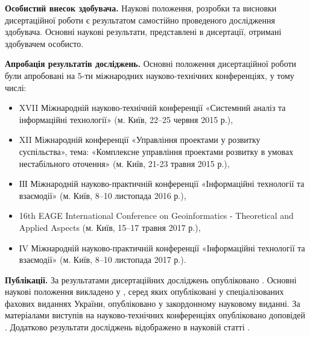 \textbf{Особистий внесок здобувача.} Наукові положення, розробки та висновки дисертаційної роботи є результатом самостійно проведеного дослідження здобувача. Основні наукові результати, представлені в дисертації, отримані здобувачем особисто.

\textbf{Апробація результатів досліджень.} Основні положення дисертаційної роботи були апробовані на 5-ти міжнародних науково-технічних конференціях, у тому числі:

\begin{itemize}
	\item XVII Міжнародній науково-технічній конференції «Системний аналіз та інформаційні технології» (м. Київ, 22--25 червня 2015 р.),
	\item XII Міжнародній конференції «Управління проектами у розвитку суспільства», тема: «Комплексне управління проектами розвитку в умовах нестабільного оточення» (м. Київ, 21-23 травня 2015 р.),
	\item ІІІ Міжнародній науково-практичній конференції «Інформаційні технології та взаємодії» (м. Київ, 8--10 листопада 2016 р.),
	\item 16th EAGE International Conference on Geoinformatics - Theoretical and Applied Aspects (м. Київ, 15--17 травня 2017 р.),
	\item ІV Міжнародній науково-практичній конференції «Інформаційні технології та взаємодії» (м. Київ, 8--10 листопада 2017 р.).
\end{itemize}

\printbibliography[heading=countauthor, env=countauthor, keyword=biblioauthor, section=1]
\printbibliography[heading=countauthorvak, env=countauthorvak, keyword=biblioauthorvak, section=1]
\printbibliography[heading=countauthorconf, env=countauthorconf, keyword=biblioauthorconf, section=1]

\textbf{Публікації.} 
За результатами дисертаційних досліджень опубліковано
. 
Основні наукові положення викладено у 
 \cite{art2,art3,art4,art5,art8},
серед яких \cite{art2,art3,art4,art5} опубліковані у спеціалізованих фахових виданнях України, 
\cite{art8} опубліковано у закордонному науковому виданні. 
За матеріалами виступів на науково-технічних конференціях опубліковано 
 доповідей \cite{conf5,conf6,conf8,conf9,conf10}.
Додатково результати досліджень відображено в науковій статті \cite{art1}.

